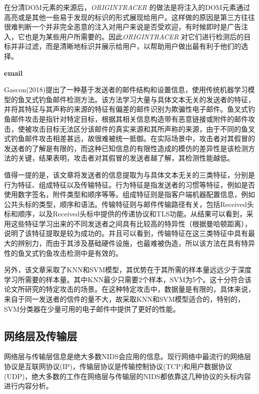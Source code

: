 \documentclass[12pt]{article} %
\begin{document}
在分清DOM元素的来源后，\textit{ORIGINTRACER} 的做法是将注入的DOM元素通过高亮或是其他一些易于发现的标识的形式展现给用户。这样做的原因是第三方往往很难判断一个并非完全恶意的注入对用户来说是否受欢迎，有时候即时是广告注入，它也是为某些用户所需要的。因此\textit{ORIGINTRACER} 对它们进行检测后的目标并非过滤，而是清晰地标识并展示给用户，以帮助用户做出最有利于他们的选择。

\textbf{email}

Gascon(2018)\cite{Gascon}提出了一种基于发送者的邮件结构和设置信息，使用传统机器学习模型的鱼叉式钓鱼邮件检测方法。该方法学习大量与具体文本无关的发送者的特征，并将其特征与其声称的来源的特征有偏差的邮件识别为欺骗性电子邮件。鱼叉式钓鱼邮件攻击是指针对特定目标，根据其相关信息构造带有恶意链接或附件的邮件攻击，使被攻击目标无法区分该邮件的真实来源和其所声称的来源，由于不同的鱼叉式钓鱼邮件攻击相差甚远，故很难被统一抵御。在实际场景中，攻击者对其假冒的发送者的了解是有限的，而这种已知信息的有限性造成的模仿的差异性是该检测方法的关键，结果表明，攻击者对其假冒的发送者越了解，其检测性能越低。

值得一提的是，该文章将发送者的信息提取为与具体文本无关的三类特征，分别是行为特征、组成特征以及传输特征。行为特征是指发送者的习惯等特征，例如是否使用数字签名，附件类型和顺序等等。组成特征则是指客户端机器配置信息，例如公共头标的类型，顺序和语法。传输特征则与邮件传输路径有关，包括Received头标和顺序，以及Received头标中提供的传递协议和TLS功能。从结果可以看到，采用这些特征学习出来的不同发送者之间具有比较高的特异性（根据曼哈顿距离），说明了该特征提取是较为成功的。并且可以看到，传输特征在这三类特征中具有最大的辨别力，而由于其涉及基础硬件设施，也最难被伪造，所以该方法在具有特异性的鱼叉式钓鱼攻击检测中是有效的。

另外，该文章采取了KNN和SVM模型，其优势在于其所需的样本量远远少于深度学习所需要的样本量。其中KNN最少只需要2个样本，SVM为5个。这十分符合该论文所研究的特定攻击的场景。在这种特定攻击中，数据量是有限的，具体来说，来自于同一发送者的信件的量不大，故采取KNN和SVM模型适合的，特别的，SVM分类器在少量可用的电子邮件中提供了更好的性能。

\subsection{网络层及传输层}
\label{ip}

网络层与传输层信息是绝大多数NIDS会应用的信息。现行网络中最流行的网络层协议是互联网协议(IP)，传输层协议是传输控制协议(TCP)和用户数据协议(UDP)，绝大多数的工作在网络层与传输层的NIDS都依靠这几种协议的头标内容进行内容分析。
\end{document}
